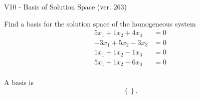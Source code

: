 \begin{exercise}
  \begin{exerciseTitle}V10 - Basis of Solution Space (ver. 263)\end{exerciseTitle}
  \begin{exerciseStatement}
    Find a basis for the solution space of the homogeneous system 
\begin{align*}
 5 x_ 1 + 1 x_ 2 + 4 x_ 3 &= 0  \\ 
  -3 x_ 1 + 5 x_ 2 -3 x_ 3 &= 0  \\ 
  1 x_ 1 + 1 x_ 2 -1 x_ 3 &= 0  \\ 
  5 x_ 1 + 1 x_ 2 -6 x_ 3 &= 0  \\ 
 \end{align*}


 
  \end{exerciseStatement}

  \begin{exerciseAnswer}
   A basis is   
\[\left\{\right\}.\]

  


  \end{exerciseAnswer}
\end{exercise}